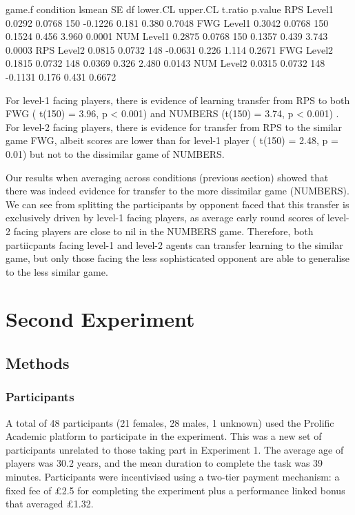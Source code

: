\documentclass[man,floatsintext]{apa6}
\begin{document}
game.f condition lsmean SE df lower.CL upper.CL t.ratio p.value
RPS Level1 0.0292 0.0768 150 -0.1226 0.181 0.380 0.7048
FWG Level1 0.3042 0.0768 150 0.1524 0.456 3.960 0.0001
NUM Level1 0.2875 0.0768 150 0.1357 0.439 3.743 0.0003
RPS Level2 0.0815 0.0732 148 -0.0631 0.226 1.114 0.2671
FWG Level2 0.1815 0.0732 148 0.0369 0.326 2.480 0.0143
NUM Level2 0.0315 0.0732 148 -0.1131 0.176 0.431 0.6672

For level-1 facing players, there is evidence of learning transfer from RPS to both FWG ( t(150) = 3.96, p \textless{} 0.001) and NUMBERS (t(150) = 3.74, p \textless{} 0.001) . For level-2 facing players, there is evidence for transfer from RPS to the similar game FWG, albeit scores are lower than for level-1 player ( t(150) = 2.48, p = 0.01) but not to the dissimilar game of NUMBERS.

Our results when averaging across conditions (previous section) showed that there was indeed evidence for transfer to the more dissimilar game (NUMBERS). We can see from splitting the participants by opponent faced that this transfer is exclusively driven by level-1 facing players, as average early round scores of level-2 facing players are close to nil in the NUMBERS game. Therefore, both partiicpants facing level-1 and level-2 agents can transfer learning to the similar game, but only those facing the less sophisticated opponent are able to generalise to the less similar game.

\newpage

\hypertarget{second-experiment}{%
\section{Second Experiment}\label{second-experiment}}

\hypertarget{methods-1}{%
\subsection{Methods}\label{methods-1}}

\hypertarget{participants-1}{%
\subsubsection{Participants}\label{participants-1}}

A total of 48 participants (21 females, 28 males, 1 unknown) used the Prolific Academic platform to participate in the experiment. This was a new set of participants unrelated to those taking part in Experiment 1. The average age of players was 30.2 years, and the mean duration to complete the task was 39 minutes. Participants were incentivised using a two-tier payment mechanism: a fixed fee of £2.5 for completing the experiment plus a performance linked bonus that averaged £1.32.
\end{document}
